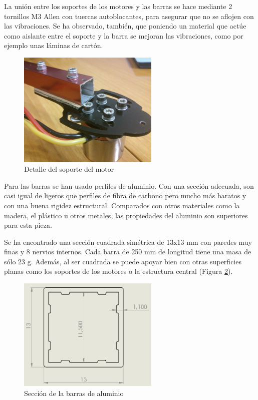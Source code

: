 \documentclass[12pt,twoside]{article}
\begin{document}
La unión entre los soportes de los motores y las barras se hace mediante 2 tornillos M3 Allen con tuercas autoblocantes, para asegurar que no se aflojen con las vibraciones. Se ha observado, también, que poniendo un material que actúe como aislante entre el soporte y la barra se mejoran las vibraciones, como por ejemplo unas láminas de cartón.

		\begin{figure}
			\centering
			\includegraphics[width=0.6\textwidth]{Imatges/Disseny_Chasis/soporte_motor.png}
			\caption{Detalle del soporte del motor}
			\label{fig:soporte_motor}
		\end{figure}

Para las barras se han usado perfiles de aluminio. Con una sección adecuada, son casi igual de ligeros que perfiles de fibra de carbono pero mucho más baratos y con una buena rigidez estructural. Comparados con otros materiales como la madera, el plástico u otros metales, las propiedades del aluminio son superiores para esta pieza.

Se ha encontrado una sección cuadrada simétrica de 13x13 mm con paredes muy finas y 8 nervios internos. Cada barra de 250 mm de longitud tiene una masa de sólo 23 g. Además, al ser cuadrada se puede apoyar bien con otras superficies planas como los soportes de los motores o la estructura central (Figura \ref{fig:seccion_barras}).

		\begin{figure}
			\centering
			\includegraphics[width=0.6\textwidth]{Imatges/Disseny_Chasis/Seccion_barras.png}
			\caption{Sección de la barras de aluminio}
			\label{fig:seccion_barras}
		\end{figure}
\end{document}

